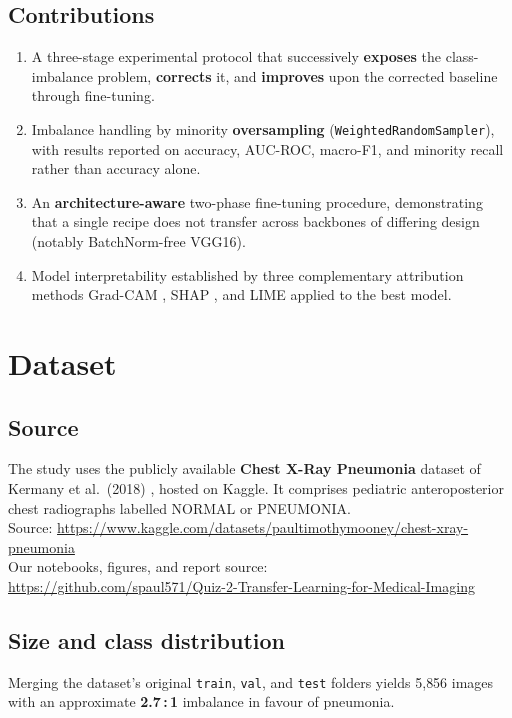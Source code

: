 \documentclass[11pt,a4paper]{article}
\numberwithin{figure}{section}
\numberwithin{table}{section}
\let\oldsection\section
\renewcommand{\section}{\clearpage\oldsection}
\begin{document}
\subsection{Contributions}
\begin{enumerate}
\item A three-stage experimental protocol that successively \textbf{exposes} the class-imbalance
problem, \textbf{corrects} it, and \textbf{improves} upon the corrected baseline through fine-tuning.
\item Imbalance handling by minority \textbf{oversampling} (\texttt{WeightedRandomSampler}), with results
reported on accuracy, AUC-ROC, macro-F1, and minority recall rather than accuracy alone.
\item An \textbf{architecture-aware} two-phase fine-tuning procedure, demonstrating that a single recipe
does not transfer across backbones of differing design (notably BatchNorm-free VGG16).
\item Model interpretability established by three complementary attribution methods Grad-CAM
\cite{gradcam}, SHAP \cite{shap}, and LIME \cite{lime} applied to the best model.
\end{enumerate}

\section{Dataset}

\subsection{Source}
The study uses the publicly available \textbf{Chest X-Ray Pneumonia} dataset of Kermany et al.\ (2018)
\cite{kermany}, hosted on Kaggle. It comprises pediatric anteroposterior chest radiographs labelled
NORMAL or PNEUMONIA.\\
Source: \url{https://www.kaggle.com/datasets/paultimothymooney/chest-xray-pneumonia}\\
Our notebooks, figures, and report source:\\
\url{https://github.com/spaul571/Quiz-2-Transfer-Learning-for-Medical-Imaging}

\subsection{Size and class distribution}
Merging the dataset's original \texttt{train}, \texttt{val}, and \texttt{test} folders yields 5{,}856
images with an approximate \textbf{2.7\,:\,1} imbalance in favour of pneumonia.
\end{document}
